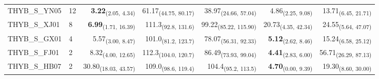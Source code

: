 \begin{table}[p]
\begin{tabular}{llrrrrr}
THYB\_S\_YN05 & 12 & \textbf{3.22}\textsubscript{(2.05, 4.34)} & 61.17\textsubscript{(44.75, 80.17)} & 38.97\textsubscript{(24.66, 57.04)} & 4.86\textsubscript{(2.25, 9.08)} & 13.71\textsubscript{(6.45, 21.71)} \\
THYB\_S\_XJ01 & 8 & \textbf{6.99}\textsubscript{(1.71, 16.39)} & 111.3\textsubscript{(92.8, 131.6)} & 99.22\textsubscript{(85.22, 115.90)} & 20.73\textsubscript{(4.35, 42.34)} & 24.55\textsubscript{(5.64, 47.07)} \\
THYB\_S\_GX01 & 4 & 5.57\textsubscript{(3.00, 8.47)} & 101.0\textsubscript{(81.2, 123.7)} & 78.07\textsubscript{(56.31, 92.33)} & \textbf{5.12}\textsubscript{(2.62, 8.46)} & 15.24\textsubscript{(6.58, 25.12)} \\
THYB\_S\_FJ01 & 2 & 8.32\textsubscript{(4.00, 12.65)} & 112.3\textsubscript{(104.0, 120.7)} & 86.49\textsubscript{(73.93, 99.04)} & \textbf{4.41}\textsubscript{(2.83, 6.00)} & 56.71\textsubscript{(26.29, 87.13)} \\
THYB\_S\_HB07 & 2 & 30.80\textsubscript{(18.03, 43.57)} & 109.0\textsubscript{(98.6, 119.4)} & 104.4\textsubscript{(95.2, 113.5)} & \textbf{4.70}\textsubscript{(0.00, 9.39)} & 19.30\textsubscript{(8.60, 30.00)} \\
\bottomrule
\end{tabular}
\end{table}
\clearpage
